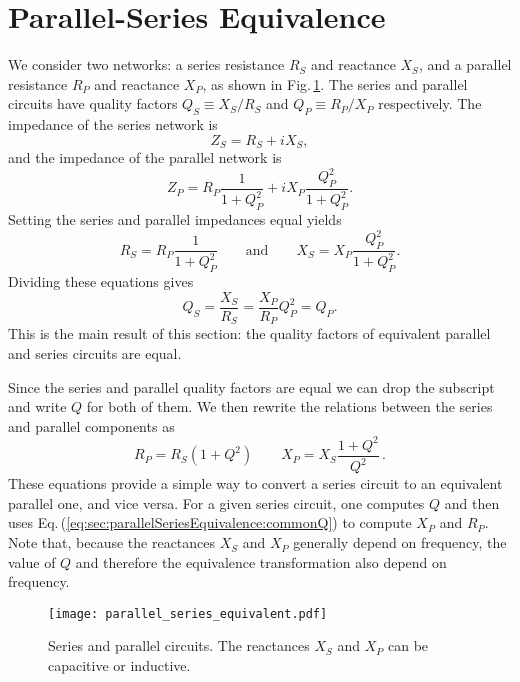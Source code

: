 \section{Parallel-Series Equivalence}

We consider two networks: a series resistance $R_{S}$ and reactance $X_{S}$, and a parallel resistance $R_P$ and reactance $X_P$, as shown in Fig.\,\ref{Fig:parallelSeriesEquivalent}.
The series and parallel circuits have quality factors $Q_S \equiv X_S / R_S$ and $Q_P \equiv R_P / X_P$ respectively.
The impedance of the series network is \begin{equation}
Z_{S}=R_{S}+iX_{S} , \end{equation}
and the impedance of the parallel network is \begin{equation}
Z_{P}=R_{P}\frac{1}{1+Q_{P}^{2}}+iX_{P}\frac{Q_{P}^{2}}{1+Q_{P}^{2}} . \end{equation}
Setting the series and parallel impedances equal yields \begin{equation}
R_{S}=R_{P}\frac{1}{1+Q_{P}^{2}} \qquad \text{and} \qquad X_{S}=X_{P}\frac{Q_{P}^{2}}{1+Q_{P}^{2}} . \end{equation}
Dividing these equations gives\begin{equation}
Q_S = \frac{X_{S}}{R_{S}}=\frac{X_{P}}{R_{P}}Q_{P}^{2}=Q_{P} . \end{equation}
This is the main result of this section: the quality factors of equivalent parallel and series circuits are equal.

Since the series and parallel quality factors are equal we can drop the subscript and write $Q$ for both of them.
We then rewrite the relations between the series and parallel components as \begin{equation}
R_{P}=R_{S}(1 + Q^2) \qquad X_{P} = X_{S}\frac{1 + Q^{2}}{Q^{2}} \, . \label{eq:sec:parallelSeriesEquivalence:commonQ} \end{equation}
These equations provide a simple way to convert a series circuit to an equivalent parallel one, and vice versa.
For a given series circuit, one computes $Q$ and then uses Eq.\,(\ref{eq:sec:parallelSeriesEquivalence:commonQ}) to compute $X_P$ and $R_P$.
Note that, because the reactances $X_S$ and $X_P$ generally depend on frequency, the value of $Q$ and therefore the equivalence transformation also depend on frequency.


\begin{figure}
\begin{centering}
\texttt{[image: parallel\_series\_equivalent.pdf]} 
\par\end{centering}
\caption{Series and parallel circuits. The reactances $X_S$ and $X_P$ can be capacitive or inductive.}
\label{Fig:parallelSeriesEquivalent}
\end{figure}


